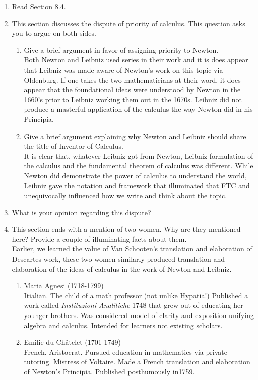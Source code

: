 \documentclass[12pt]{article}
\begin{document}
\begin{enumerate}
\item Read Section 8.4.
\item This section discusses the dispute of priority of calculus. This question asks you to argue on both sides.
	\begin{enumerate}
	\item Give a brief argument in favor of assigning priority to Newton.\\
	
	Both Newton and Leibniz used series in their work and it is does appear that Leibniz was made aware of Newton's work on this topic via Oldenburg. If one takes the two mathematicians at their word, it does appear that the foundational ideas were understood by Newton in the 1660's prior to Leibniz working them out in the 1670s. Leibniz did not produce a masterful application of the calculus the way Newton did in his Principia.
	\vfill
	\item Give a brief argument explaining why Newton and Leibniz should share the title of Inventor of Calculus.\\
	
	It is clear that, whatever Leibniz got from Newton, Leibniz formulation of the calculus and the fundamental theorem of calculus was different. While Newton did demonstrate the power of calculus to understand the world, Leibniz gave the notation and framework that illuminated that FTC and unequivocally influenced how we write and think about the topic.
	\vfill
	\end{enumerate}
\item What is your opinion regarding this dispute? 
\vfill
\item This section ends with a mention of two women. Why are they mentioned here? Provide a couple of illuminating facts about them.\\

Earlier, we learned the value of Van Schooten's translation and elaboration of Descartes work, these two women similarly produced translation and elaboration of the ideas of calculus in the work of Newton and Leibniz.
	\begin{enumerate}
	\item Maria Agnesi (1718-1799)\\
	
	Itialian. The child of a math professor (not unlike Hypatia!) Published a work called \textit{Instituzioni Analitiche} 1748 that grew out of educating her younger brothers. Was considered model of clarity and exposition unifying algebra and calculus. Intended for learners not existing scholars.
	\vfill
	\item Emilie du Ch\^atelet (1701-1749)\\
	French. Aristocrat. Pursued education in mathematics via private tutoring. Mistress of Voltaire. Made a French translation and elaboration of Newton's Principia. Published posthumously in1759. 
	\vfill
	\end{enumerate}

\end{enumerate}
\end{document}
